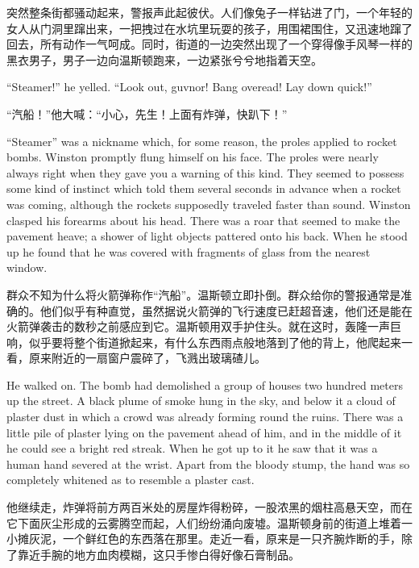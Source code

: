 \begin{paracol}{2}
\switchcolumn

突然整条街都骚动起来，警报声此起彼伏。人们像兔子一样钻进了门，一个年轻的女人从门洞里蹿出来，一把拽过在水坑里玩耍的孩子，用围裙围住，又迅速地蹿了回去，所有动作一气呵成。同时，街道的一边突然出现了一个穿得像手风琴一样的黑衣男子，男子一边向温斯顿跑来，一边紧张兮兮地指着天空。

\switchcolumn*

``Steamer!'' he yelled. ``Look out, guv\textquotesingle nor! Bang
over\textquotesingle ead! Lay down quick!''

\switchcolumn

``汽船！''他大喊：``小心，先生！上面有炸弹，快趴下！''

\switchcolumn*

``Steamer'' was a nickname which, for some reason, the proles applied to
rocket bombs. Winston promptly flung himself on his face. The proles
were nearly always right when they gave you a warning of this kind. They
seemed to possess some kind of instinct which told them several seconds
in advance when a rocket was coming, although the rockets supposedly
traveled faster than sound. Winston clasped his forearms about his head.
There was a roar that seemed to make the pavement heave; a shower of
light objects pattered onto his back. When he stood up he found that he
was covered with fragments of glass from the nearest window.

\switchcolumn

群众不知为什么将火箭弹称作``汽船''。温斯顿立即扑倒。群众给你的警报通常是准确的。他们似乎有种直觉，虽然据说火箭弹的飞行速度已赶超音速，他们还是能在火箭弹袭击的数秒之前感应到它。温斯顿用双手护住头。就在这时，轰隆一声巨响，似乎要将整个街道掀起来，有什么东西雨点般地落到了他的背上，他爬起来一看，原来附近的一扇窗户震碎了，飞溅出玻璃碴儿。

\switchcolumn*

He walked on. The bomb had demolished a group of houses two hundred
meters up the street. A black plume of smoke hung in the sky, and below
it a cloud of plaster dust in which a crowd was already forming round
the ruins. There was a little pile of plaster lying on the pavement
ahead of him, and in the middle of it he could see a bright red streak.
When he got up to it he saw that it was a human hand severed at the
wrist. Apart from the bloody stump, the hand was so completely whitened
as to resemble a plaster cast.

\switchcolumn

他继续走，炸弹将前方两百米处的房屋炸得粉碎，一股浓黑的烟柱高悬天空，而在它下面灰尘形成的云雾腾空而起，人们纷纷涌向废墟。温斯顿身前的街道上堆着一小摊灰泥，一个鲜红色的东西落在那里。走近一看，原来是一只齐腕炸断的手，除了靠近手腕的地方血肉模糊，这只手惨白得好像石膏制品。


\end{paracol}
